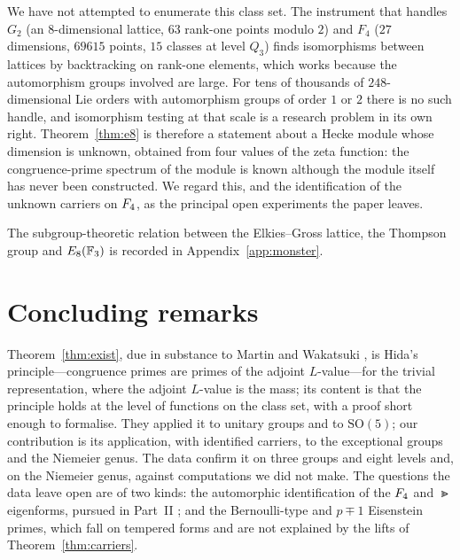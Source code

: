 \documentclass[11pt]{amsart}
\theoremstyle{definition}
\begin{document}
We have not attempted to enumerate this class set. The instrument that handles $G_2$ (an $8$-dimensional lattice, $63$ rank-one points modulo $2$) and $F_4$ ($27$ dimensions, $69615$ points, $15$ classes at level $Q_3$) finds isomorphisms between lattices by backtracking on rank-one elements, which works because the automorphism groups involved are large. For tens of thousands of $248$-dimensional Lie orders with automorphism groups of order $1$ or $2$ there is no such handle, and isomorphism testing at that scale is a research problem in its own right. Theorem~\ref{thm:e8} is therefore a statement about a Hecke module whose dimension is unknown, obtained from four values of the zeta function: the congruence-prime spectrum of the module is known although the module itself has never been constructed. We regard this, and the identification of the unknown carriers on $F_4$, as the principal open experiments the paper leaves.

The subgroup-theoretic relation between the Elkies--Gross lattice, the Thompson group and $E_8(\mathbb{F}_3)$ is recorded in Appendix~\ref{app:monster}.

\section{Concluding remarks}
Theorem~\ref{thm:exist}, due in substance to Martin and Wakatsuki \cite{MW24}, is Hida's principle---congruence primes are primes of the adjoint $L$-value---for the trivial representation, where the adjoint $L$-value is the mass; its content is that the principle holds at the level of functions on the class set, with a proof short enough to formalise. They applied it to unitary groups and to $\mathrm{SO}(5)$; our contribution is its application, with identified carriers, to the exceptional groups and the Niemeier genus. The data confirm it on three groups and eight levels and, on the Niemeier genus, against computations we did not make. The questions the data leave open are of two kinds: the automorphic identification of the $F_4$ and $\Gt$ eigenforms, pursued in Part~II \cite{PartII}; and the Bernoulli-type and $p\mp1$ Eisenstein primes, which fall on tempered forms and are not explained by the lifts of Theorem~\ref{thm:carriers}.

\appendix
\end{document}
